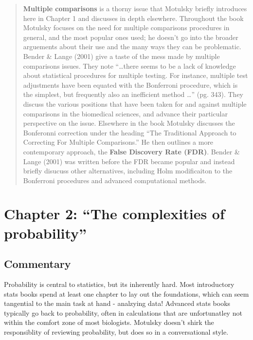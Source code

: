 \documentclass[]{book}
\theoremstyle{definition}
\theoremstyle{definition}
\theoremstyle{definition}
\theoremstyle{remark}
\begin{document}
\begin{quote}
\textbf{Multiple comparisons} is a thorny issue that Motulsky briefly
introduces here in Chapter 1 and discusses in depth elsewhere.
Throughout the book Motulsky focuses on the need for multiple
comparisons procedures in general, and the most popular ones used; he
doesn't go into the broader arguements about their use and the many ways
they can be problematic. Bender \& Lange (2001) give a taste of the mess
made by multiple comparisons issues. They note ``\ldots{}there seems to
be a lack of knowledge about statistical procedures for multiple
testing. For instance, multiple test adjustments have been equated with
the Bonferroni procedure, which is the simplest, but frequently also an
inefficient method \ldots{}'' (pg. 343). They discuss the various
positions that have been taken for and against multiple comparisons in
the biomedical sciences, and advance their particular perspective on the
issue. Elsewhere in the book Motulsky discusses the Bonferonni
correction under the heading ``The Traditional Approach to Correcting
For Multiple Comparisons.'' He then outlines a more contemporary
approach, the \textbf{False Discovery Rate (FDR)}. Bender \& Lange
(2001) was written before the FDR became popular and instead briefly
disucuss other alternatives, including Holm modificaiton to the
Bonferroni procedures and advanced computational methods.
\end{quote}

\chapter{\texorpdfstring{Chapter 2: ``The complexities of
probability''}{Chapter 2: The complexities of probability}}\label{intro2}

\section*{Commentary}\label{commentary-1}

Probability is central to statistics, but its inherently hard. Most
introductory stats books spend at least one chapter to lay out the
foundations, which can seem tangential to the main task at hand -
analzying data! Advanced stats books typically go back to probability,
often in calculations that are unfortunatley not within the comfort zone
of most biologists. Motulsky doesn't shirk the responsiblity of
reviewing probability, but does so in a conversational style.
\end{document}
